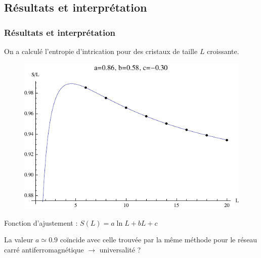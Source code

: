 \documentclass[10pt,a4paper]{beamer}
\newcommand{\1}{\ensuremath{\ket{\om_1\bom_1}}\xspace}
\newcommand{\2}{\ensuremath{\ket{\om_2\bom_2}}\xspace}
\begin{document}
\subsection{Résultats et interprétation}
\begin{frame}
\frametitle{Résultats et interprétation}
On a calculé l'entropie d'intrication pour des cristaux de taille $L$ croissante.
\begin{figure}[htp]
\centering
\includegraphics[scale=0.50]{vector_img/ent.pdf}
\end{figure}
Fonction d'ajustement : $S(L)=a\ln L +bL+c$

La valeur $a \simeq 0.9$ coïncide avec celle trouvée par la même méthode pour le réseau carré antiferromagnétique $ \rightarrow$ universalité ?
\end{frame}
\end{document}
